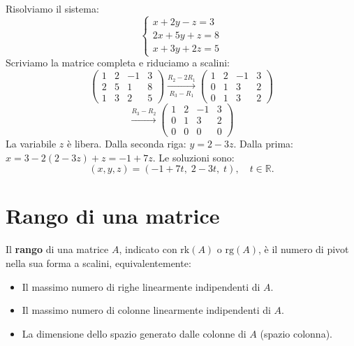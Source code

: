 \begin{examplebox}
\label{ex:gauss}
Risolviamo il sistema:
\[
\begin{cases}
x + 2y - z = 3 \\
2x + 5y + z = 8 \\
x + 3y + 2z = 5
\end{cases}
\]
Scriviamo la matrice completa e riduciamo a scalini:
\[
\left( \begin{array}{ccc|c} 1 & 2 & -1 & 3 \\ 2 & 5 & 1 & 8 \\ 1 & 3 & 2 & 5 \end{array} \right)
\xrightarrow[\scriptscriptstyle R_3 - R_1]{\scriptscriptstyle R_2 - 2R_1}
\left( \begin{array}{ccc|c} 1 & 2 & -1 & 3 \\ 0 & 1 & 3 & 2 \\ 0 & 1 & 3 & 2 \end{array} \right)
\]
\[
\xrightarrow{\scriptscriptstyle R_3 - R_2}
\left( \begin{array}{ccc|c} 1 & 2 & -1 & 3 \\ 0 & 1 & 3 & 2 \\ 0 & 0 & 0 & 0 \end{array} \right)
\]
La variabile $z$ è libera. Dalla seconda riga: $y = 2 - 3z$. Dalla prima: $x = 3 - 2(2-3z) + z = -1 + 7z$. Le soluzioni sono:
\[ (x, y, z) = (-1 + 7t, \; 2 - 3t, \; t), \quad t \in \mathbb{R}. \]
\end{examplebox}

\section{Rango di una matrice}
\label{sec:rango}

\begin{definitionbox}[Rango]
Il \textbf{rango} di una matrice $A$, indicato con $\text{rk}(A)$ o $\text{rg}(A)$, è il numero di pivot nella sua forma a scalini, equivalentemente:
\begin{itemize}
    \item Il massimo numero di righe linearmente indipendenti di $A$.
    \item Il massimo numero di colonne linearmente indipendenti di $A$.
    \item La dimensione dello spazio generato dalle colonne di $A$ (spazio colonna).
\end{itemize}
\end{definitionbox}

